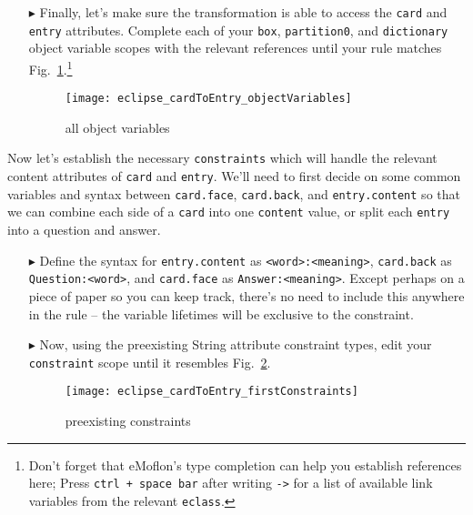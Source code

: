 \begin{itemize}
\vspace{0.5cm}

\item[$\blacktriangleright$] Finally, let's make sure the transformation is able to access the \texttt{card} and \texttt{entry} attributes. Complete each
of your \texttt{box}, \texttt{partition0}, and \texttt{dictionary} object variable scopes with the relevant references until your rule matches
Fig.~\ref{fig:c2eAllReferences}.\footnote{Don't forget that eMoflon's type completion can help you establish references here; Press \texttt{ctrl + space bar} after writing \texttt{->} for a list of available
link variables from the relevant \texttt{eclass}.}

\newpage

\begin{figure}[htb]
\begin{center}
  \texttt{[image: eclipse\_cardToEntry\_objectVariables]}
  \caption{all object variables}
  \label{fig:c2eAllReferences}
\end{center}
\end{figure}

\end{itemize}

Now let's establish the necessary \texttt{constraints} which will handle the relevant content attributes of \texttt{card} and \texttt{entry}. We'll need to
first decide on some common variables and syntax between \texttt{card.face}, \texttt{card.back}, and \texttt{entry.content} so that we can combine each side of
a \texttt{card} into one \texttt{content} value, or split each \texttt{entry} into a question and answer. 

\begin{itemize}

\item[$\blacktriangleright$] Define the syntax for \texttt{entry.content} as \texttt{<word>:<meaning>}, \texttt{card.back} as \texttt{Question:<word>}, and
\texttt{card.face} as \texttt{Answer:<meaning>}. Except perhaps on a piece of paper so you can keep track, there's no need to include this anywhere in the rule
-- the variable lifetimes will be exclusive to the constraint.

\vspace{0.5cm}

\item[$\blacktriangleright$] Now, using the preexisting String attribute constraint types, edit your \texttt{constraint} scope until it resembles
Fig.~\ref{fig:contentConstraints}.

\begin{figure}[htbp]
\begin{center}
  \texttt{[image: eclipse\_cardToEntry\_firstConstraints]}
  \caption{preexisting constraints}
  \label{fig:contentConstraints}
\end{center}
\end{figure}

\end{itemize}

